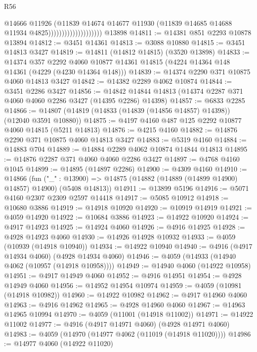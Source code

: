 \begin{lexlean}{R56}
\begin{coremodule}
                                        @14666
                                        @11926
                                        (@11839
                                          @14674
                                          @14677
                                          @11930
                                          (@11839 @14685 @14688 @11934 @4825))))))))))))))))))))
    @13898
@14811 := @14381 @851 @2293 @10878 @13894
@14812 := @3451 @14361
@14813 := @3088 @10880
@14815 := @3451 @14813 @3427
@14819 := @14811 (@14812 @14815) (@3520 @13898)
@14833 := @14374
    @357
    @2292
    @4060
    @10877
    @14361
    @14815
    (@4224 @14364 @148 @14361 (@4229 (@4230 @14364 @148)))
@14839 := @14374 @2290 @371 @10875 @4060 @14813 @3427
@14842 := @14382 @2289 @4062 @10874
@14844 := @3451 @2286 @3427
@14856 := @14842 @14844 @14813 (@14374 @2287 @371 @4060 @4060 @2286 @3427 (@14395 @2286) @14398)
@14857 := @6833 @2285
@14866 := @14807 (@14819 (@14833 (@14839 (@14856 @14857) @14398)) (@12040 @3591 @10880))
@14875 := @4197 @4160 @487 @125 @2292 @10877 @4060 @14815 (@5211 @14813)
@14876 := @4215 @4160
@14882 := @14876 @2290 @371 @10875 @4060 @14813 @3427
@14883 := @5319 @4160
@14884 := @14883 @704
@14889 := @14884 @2289 @4062 @10874 @14844 @14813
@14895 := @14876 @2287 @371 @4060 @4060 @2286 @3427
@14897 := @4768 @4160 @1045
@14899 := @14895 (@14897 @2286)
@14900 := @4309 @4160
@14910 := @14866
    (fun ("_" : @13900) => @14875 (@14882 (@14889 (@14899 @14900) @14857) @14900) (@5408 @14813))
@14911 := @13899 @5196
@14916 := @5071 @4160 @2307 @2309 @2597 @14418
@14917 := @5085 @10912
@14918 := @10680 @3886
@14919 := @14918 @10920
@14920 := @10919 @14919
@14921 := @4059 @14920
@14922 := @10684 @3886
@14923 := @14922 @10920
@14924 := @4917 @14923
@14925 := @14924 @4060
@14926 := @4916 @14925
@14928 := @4928 @14923 @4060
@14930 := @14926 @14928 @10932
@14933 := @4059 (@10939 (@14918 @10940))
@14934 := @14922 @10940
@14940 := @4916 (@4917 @14934 @4060) (@4928 @14934 @4060)
@14946 := @4059 (@14933 (@14940 @4062 (@10957 (@14918 @10958))))
@14949 := @14940 @4060 (@14922 @10958)
@14951 := @4917 @14949 @4060
@14952 := @4916 @14951
@14954 := @4928 @14949 @4060
@14956 := @14952 @14954 @10974
@14959 := @4059 (@10981 (@14918 @10982))
@14960 := @14922 @10982
@14962 := @4917 @14960 @4060
@14963 := @4916 @14962
@14965 := @4928 @14960 @4060
@14967 := @14963 @14965 @10994
@14970 := @4059 (@11001 (@14918 @11002))
@14971 := @14922 @11002
@14977 := @4916 (@4917 @14971 @4060) (@4928 @14971 @4060)
@14983 := @4059 (@14970 (@14977 @4062 (@11019 (@14918 @11020))))
@14986 := @14977 @4060 (@14922 @11020)

\end{coremodule}
\end{lexlean}
